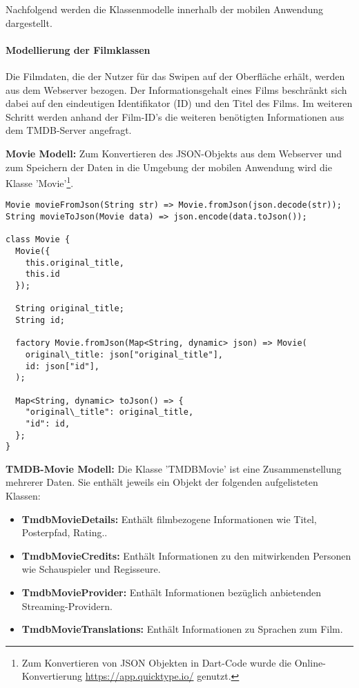 Nachfolgend werden die Klassenmodelle innerhalb der mobilen Anwendung dargestellt.

\paragraph{Modellierung der Filmklassen}
Die Filmdaten, die der Nutzer für das Swipen auf der Oberfläche erhält, werden aus dem Webserver bezogen. Der Informationsgehalt eines Films beschränkt sich dabei auf den eindeutigen Identifikator (ID) und den Titel des Films.
Im weiteren Schritt werden anhand der Film-ID's die weiteren benötigten Informationen aus dem TMDB-Server angefragt. 

\noindent
\textbf{Movie Modell:}
Zum Konvertieren des JSON-Objekts aus dem Webserver und zum Speichern der Daten in die Umgebung der mobilen Anwendung wird die Klasse 'Movie'\footnote{Zum Konvertieren von JSON Objekten in Dart-Code wurde die Online-Konvertierung \url{https://app.quicktype.io/} genutzt.}. 


\begin{lstlisting}[caption=Movie Modell - JSON Konvertierung, label=lst:moviemodel]
Movie movieFromJson(String str) => Movie.fromJson(json.decode(str));
String movieToJson(Movie data) => json.encode(data.toJson());

class Movie {
  Movie({
    this.original_title,
    this.id
  });

  String original_title;
  String id;

  factory Movie.fromJson(Map<String, dynamic> json) => Movie(
    original\_title: json["original_title"],
    id: json["id"],
  );

  Map<String, dynamic> toJson() => {
    "original\_title": original_title,
    "id": id,
  };
}
\end{lstlisting}

\noindent
\textbf{TMDB-Movie Modell:}
Die Klasse 'TMDBMovie' ist eine Zusammenstellung mehrerer Daten. Sie enthält jeweils ein Objekt der folgenden aufgelisteten Klassen:

\begin{itemize}
\item \textbf{TmdbMovieDetails:} Enthält filmbezogene Informationen wie Titel, Posterpfad, Rating..
\item \textbf{TmdbMovieCredits:} Enthält Informationen zu den mitwirkenden Personen wie Schauspieler und Regisseure.
\item \textbf{TmdbMovieProvider:} Enthält Informationen bezüglich anbietenden Streaming-Providern.
\item \textbf{TmdbMovieTranslations:} Enthält Informationen zu Sprachen zum Film.
\end{itemize}

